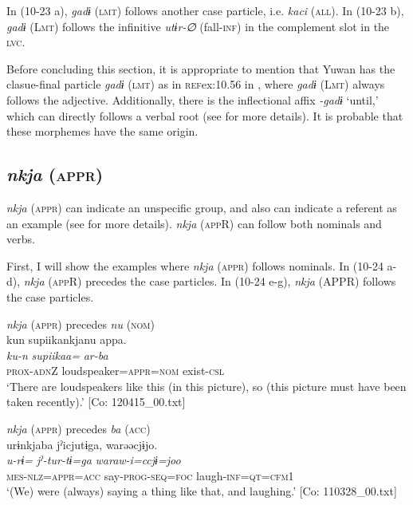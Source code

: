 In (10-23 a), \textit{gadɨ} (\textsc{lmt}) follows another case particle, i.e. \textit{kaci} (\textsc{all}). In (10-23 b), \textit{gadɨ} (L\textsc{mt}) follows the infinitive \textit{utɨr-∅} (fall-\textsc{inf}) in the complement slot in the \textsc{lvc}.

  Before concluding this section, it is appropriate to mention that Yuwan has the clasue-final particle \textit{gadɨ} (\textsc{lmt}) as in \textsc{ref}{ex:10.56} in , where \textit{gadɨ} (L\textsc{mt}) always follows the adjective. Additionally, there is the inflectional affix \textit{{}-gadɨ} ‘until,’ which can directly follows a verbal root (see  for more details). It is probable that these morphemes have the same origin.

\subsection{\textit{nkja} (\textsc{appr})}\label{sec:10.1.6}

\textit{nkja} (\textsc{appr}) can indicate an unspecific group, and also can indicate a referent as an example (see  for more details). \textit{nkja} (\textsc{app}R) can follow both nominals and verbs.

  First, I will show the examples where \textit{nkja} (\textsc{appr}) follows nominals. In (10-24 a-d), \textit{nkja} (\textsc{app}R) precedes the case particles. In (10-24 e-g), \textit{nkja} (APPR) follows the case particles.

\ea\label{ex:10.24} 
  \ea \textit{nkja} (\textsc{appr}) precedes \textit{nu} (\textsc{nom})\\
      \glll    kun  {\textbar}supiika{\textbar}nkjanu  appa.\\
      \textit{ku-n}  \textit{supiikaa=}  \textit{ar-ba}\\
      \textsc{prox}-\textsc{adn}Z  loudspeaker=\textsc{appr}=\textsc{nom}  exist-\textsc{csl}\\
      \glt       ‘There are loudspeakers like this (in this picture), so (this picture must have been taken recently).’ [Co: 120415\_00.txt]

  \ex  \textit{nkja} (\textsc{appr}) precedes \textit{ba} (\textsc{acc})\\
      \glll    urɨnkjaba  jˀicjutɨga,  warəəcjɨjo.\\
      \textit{u-rɨ=}  \textit{jˀ-tur-tɨ=ga}  \textit{waraw-i=ccjɨ=joo}\\
      \textsc{mes}-\textsc{nlz}=\textsc{appr}=\textsc{acc}  say-\textsc{prog}-\textsc{seq}=\textsc{foc}  laugh-\textsc{inf}=\textsc{qt}=\textsc{cfm}1\\
      \glt       ‘(We) were (always) saying a thing like that, and laughing.’ [Co: 110328\_00.txt]

